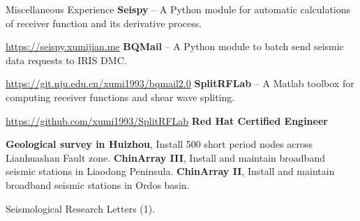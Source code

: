 \begin{rubric}{Miscellaneous Experience}
%
\entry*[2016] \textbf{Seispy} -- A Python module for automatic calculations of receiver function and its derivative process.
    
    \url{https://seispy.xumijian.me}
\entry*[2015] \textbf{BQMail} -- A Python module to batch send seismic data requests to IRIS DMC.
    
    \url{https://git.nju.edu.cn/xumi1993/bqmail2.0}
\entry*[2014] \textbf{SplitRFLab} -- A Matlab toolbox for computing receiver functions and shear wave spliting.

    \url{https://github.com/xumi1993/SplitRFLab}
\entry*[2015] \textbf{Red Hat Certified Engineer}

\entry*[2019] \textbf{Geological survey in Huizhou}, Install 500 short period nodes across Lianhuashan Fault zone.
\entry*[2018 -- 2020] \textbf{ChinArray III}, Install and maintain broadband seismic stations in Liaodong Peninsula.
\entry*[2013 -- 2016] \textbf{ChinArray II}, Install and maintain broadband seismic stations in Ordos basin.

\entry*[]Seismological Research Letters (1).
\end{rubric}